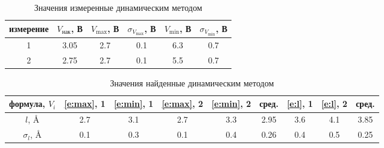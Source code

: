 \documentclass[a4paper,12pt]{article} %
\begin{document}
\begin{table}[]
\centering
\begin{tabular}{|c|c|c|c|c|c|}
\hline
измерение & $V_\text{нак}$, В & $V_{\max}$, В & $\sigma_{V_{\max}}$, В & $V_{\min}$, В & $\sigma_{V_{\min}}$, В \\ \hline
1         & 3.05              & 2.7           & 0.1                    & 6.3           & 0.7                    \\ \hline
2         & 2.75              & 2.7           & 0.1                    & 5.5           & 0.7                    \\ \hline
\end{tabular}
\caption{Значения измеренные динамическим методом}
\label{tab:dynamic}
\end{table}

\begin{table}[]
\centering
\begin{tabular}{|c|c|c|c|c|c|c|c|c|}
\hline
формула, $V_i$ & \eqref{e:max}, 1 & \eqref{e:min}, 1 & \eqref{e:max}, 2 & \eqref{e:min}, 2 & сред. & \eqref{e:l}, 1 & \eqref{e:l}, 2 & сред. \\ \hline
$l$, Å         & 2.7  & 3.1  & 2.7  & 3.3  & 2.95 & 3.6                       & 4.1                       & 3.85                      \\ \hline
$\sigma_l$, Å  & 0.1  & 0.3  & 0.1  & 0.4  & 0.26 & 0.4                       & 0.5                       & 0.25                      \\ \hline
\end{tabular}
\caption{Значения найденные динамическим методом}
\label{tab:dynamic_res}
\end{table}
\end{document}
